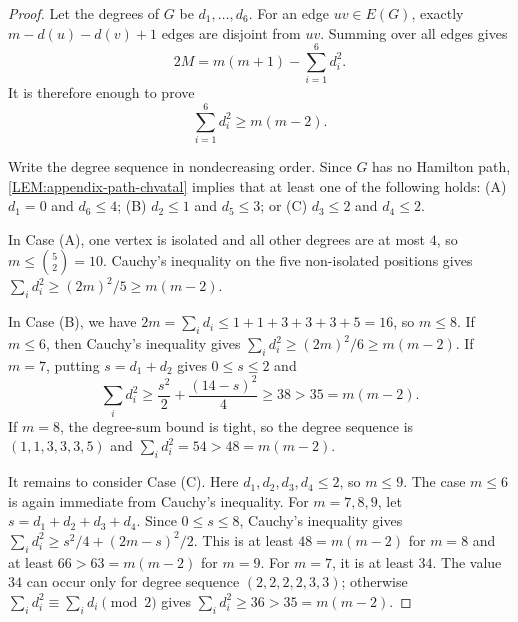\documentclass[10pt,a4paper]{article}
\theoremstyle{plain}
\theoremstyle{definition}
\begin{document}
\begin{proof}
Let the degrees of $G$ be $d_1,\ldots,d_6$.
For an edge $uv\in E(G)$, exactly $m-d(u)-d(v)+1$ edges are disjoint from $uv$.
Summing over all edges gives
\begin{equation}\label{EQ:appendix-disjoint-pair-count}
2M=m(m+1)-\sum_{i=1}^6 d_i^2.
\end{equation}
It is therefore enough to prove
\begin{equation}\label{EQ:appendix-degree-square}
\sum_{i=1}^6 d_i^2\ge m(m-2).
\end{equation}

Write the degree sequence in nondecreasing order.
Since $G$ has no Hamilton path, \cref{LEM:appendix-path-chvatal} implies that at least one of the following holds: \textup{(A)} $d_1=0$ and $d_6\le4$; \textup{(B)} $d_2\le1$ and $d_5\le3$; or \textup{(C)} $d_3\le2$ and $d_4\le2$.

In Case \textup{(A)}, one vertex is isolated and all other degrees are at most $4$, so $m\le\binom52=10$.
Cauchy's inequality on the five non-isolated positions gives $\sum_i d_i^2\ge(2m)^2/5\ge m(m-2)$.

In Case \textup{(B)}, we have $2m=\sum_i d_i\le1+1+3+3+3+5=16$, so $m\le8$.
If $m\le6$, then Cauchy's inequality gives $\sum_i d_i^2\ge(2m)^2/6\ge m(m-2)$.
If $m=7$, putting $s=d_1+d_2$ gives $0\le s\le2$ and
\[
\sum_i d_i^2\ge \frac{s^2}{2}+\frac{(14-s)^2}{4}\ge38>35=m(m-2).
\]
If $m=8$, the degree-sum bound is tight, so the degree sequence is $(1,1,3,3,3,5)$ and $\sum_i d_i^2=54>48=m(m-2)$.

It remains to consider Case \textup{(C)}.
Here $d_1,d_2,d_3,d_4\le2$, so $m\le9$.
The case $m\le6$ is again immediate from Cauchy's inequality.
For $m=7,8,9$, let $s=d_1+d_2+d_3+d_4$.
Since $0\le s\le8$, Cauchy's inequality gives $\sum_i d_i^2\ge s^2/4+(2m-s)^2/2$.
This is at least $48=m(m-2)$ for $m=8$ and at least $66>63=m(m-2)$ for $m=9$.
For $m=7$, it is at least $34$.
The value $34$ can occur only for degree sequence $(2,2,2,2,3,3)$; otherwise $\sum_i d_i^2\equiv \sum_i d_i\pmod2$ gives $\sum_i d_i^2\ge36>35=m(m-2)$.


\end{proof}
\end{document}
